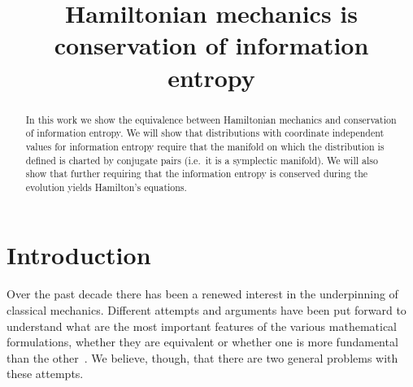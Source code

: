 \documentclass[11pt]{elsarticle}
\begin{document}
\title{Hamiltonian mechanics is conservation of information entropy}

\begin{abstract}
	In this work we show the equivalence between Hamiltonian mechanics and conservation of information entropy. We will show that distributions with coordinate independent values for information entropy require that the manifold on which the distribution is defined is charted by conjugate pairs (i.e.~it is a symplectic manifold). We will also show that further requiring that the information entropy is conserved during the evolution yields Hamilton's equations.
\end{abstract}

\maketitle

\tableofcontents
\newpage

\section{Introduction}

Over the past decade there has been a renewed interest in the underpinning of classical mechanics. Different attempts and arguments have been put forward to understand what are the most important features of the various mathematical formulations, whether they are equivalent or whether one is more fundamental than the other~\cite{North,Curiel,Barrett1,Barrett2}. We believe, though, that there are two general problems with these attempts.
\end{document}
